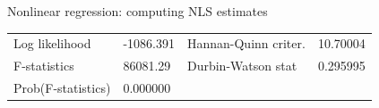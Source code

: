 \documentclass{beamer}
\begin{document}
\begin{frame}{Nonlinear regression: computing NLS estimates}
\begin{table}[]
\begin{tabular}{@{}lllll@{}}
Log likelihood                                               & -1086.391                                            & \multicolumn{2}{l}{Hannan-Quinn criter.}                                                                             & 10.70004                                           \\
F-statistics                                                 & 86081.29                                             & \multicolumn{2}{l}{Durbin-Watson stat}                                                                               & 0.295995                                           \\
Prob(F-statistics)                                           & 0.000000                                             & \multicolumn{2}{l}{}                                                                                                 &                                                    \\ \bottomrule
\end{tabular}
\end{table}
\end{frame}
\end{document}
